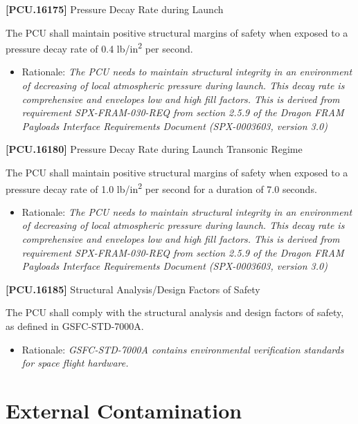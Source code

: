 \documentclass[12pt,oneside,oldfontcommands]{memoir}
\begin{document}
\textbf{[PCU.16175]} Pressure Decay Rate during Launch

The \gls{PCU} shall maintain positive structural margins of safety when exposed to a pressure decay rate of 0.4 lb\slash in\textsuperscript{2} per second.

\begin{itemize}
\item{} Rationale: \emph{The PCU needs to maintain structural integrity in an environment of decreasing of local atmospheric pressure during launch. This decay rate is comprehensive and envelopes low and high fill factors. This is derived from requirement SPX-FRAM-030-REQ from section 2.5.9 of the Dragon FRAM Payloads Interface Requirements Document (SPX-0003603, version 3.0)}

\end{itemize}

\textbf{[PCU.16180]} Pressure Decay Rate during Launch Transonic Regime

The \gls{PCU} shall maintain positive structural margins of safety when exposed to a pressure decay rate of 1.0 lb\slash in\textsuperscript{2} per second for a duration of 7.0 seconds.

\begin{itemize}
\item{} Rationale: \emph{The PCU needs to maintain structural integrity in an environment of decreasing of local atmospheric pressure during launch. This decay rate is comprehensive and envelopes low and high fill factors. This is derived from requirement SPX-FRAM-030-REQ from section 2.5.9 of the Dragon FRAM Payloads Interface Requirements Document (SPX-0003603, version 3.0)}

\end{itemize}

\textbf{[PCU.16185]} Structural Analysis\slash Design Factors of Safety

The \gls{PCU} shall comply with the structural analysis and design factors of safety, as defined in \gls{GSFC}-STD-7000A.

\begin{itemize}
\item{} Rationale: \emph{GSFC-STD-7000A contains environmental verification standards for space flight hardware.}

\end{itemize}

\section{External Contamination}
\label{externalcontamination}
\end{document}

